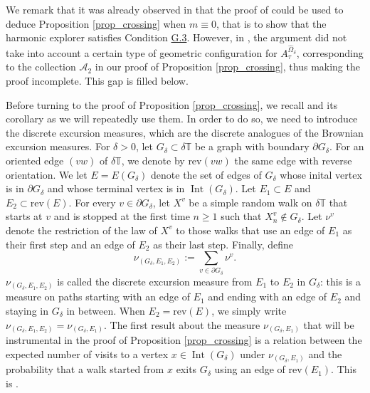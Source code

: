 \documentclass{article}
\theoremstyle{definition}
\theoremstyle{remark}
\theoremstyle{remark}
\begin{document}
We remark that it was already observed in \cite[Section~4.4]{Smirnov} that the proof of \cite[Proposition~6.3]{HE} could be used to deduce Proposition \ref{prop_crossing} when $m \equiv 0$, that is to show that the harmonic explorer satisfies Condition \hyperref[condG3]{G.3}. However, in \cite[Section~4.4]{Smirnov}, the argument did not take into account a certain type of geometric configuration for $A_{\tau}^{\hat \Omega_{\delta}}$, corresponding to the collection $\mathcal{A}_2$ in our proof of Proposition \ref{prop_crossing}, thus making the proof incomplete. This gap is filled below.

Before turning to the proof of Proposition \ref{prop_crossing}, we recall \cite[Lemma~6.1]{HE} and its corollary \cite[Corollary~6.2]{HE} as we will repeatedly use them. In order to do so, we need to introduce the discrete excursion measures, which are the discrete analogues of the Brownian excursion measures. For $\delta>0$, let $G_{\delta} \subset \delta\mathbb{T}$ be a graph with boundary $\partial G_{\delta}$. For an oriented edge $(vw)$ of $\delta \mathbb{T}$, we denote by $\text{rev}(vw)$ the same edge with reverse orientation. We let $E=E(G_{\delta})$ denote the set of edges of $G_{\delta}$ whose inital vertex is in $\partial G_{\delta}$ and whose terminal vertex is in $\operatorname{Int}(G_{\delta})$. Let $E_1 \subset E$ and $E_2 \subset \text{rev}(E)$. For every $v \in \partial G_{\delta}$, let $X^v$ be a simple random walk on $\delta \mathbb{T}$ that starts at $v$ and is stopped at the first time $n \geq 1$ such that $X^v_n \notin G_{\delta}$. Let $\nu^v$ denote the restriction of the law of $X^v$ to those walks that use an edge of $E_1$ as their first step and an edge of $E_2$ as their last step. Finally, define
\begin{equation*}
    \nu_{(G_{\delta}, E_1, E_2)} := \sum_{v \in \partial G_{\delta}} \nu^{v}.
\end{equation*}
$\nu_{(G_{\delta}, E_1, E_2)}$ is called the discrete excursion measure from $E_1$ to $E_2$ in $G_{\delta}$: this is a measure on paths starting with an edge of $E_1$ and ending with an edge of $E_2$ and staying in $G_{\delta}$ in between. When $E_2 = \text{rev}(E)$, we simply write $\nu_{(G_{\delta},E_1,E_2)} = \nu_{(G_{\delta},E_1)}$. The first result about the measure $\nu_{(G_{\delta},E_1)}$ that will be instrumental in the proof of Proposition \ref{prop_crossing} is a relation between the expected number of visits to a vertex $x \in \operatorname{Int}(G_{\delta})$ under $\nu_{(G_{\delta},E_1)}$ and the probability that a walk started from $x$ exits $G_{\delta}$ using an edge of $\text{rev}(E_1)$. This is \cite[Lemma~6.1]{HE}.
\end{document}

